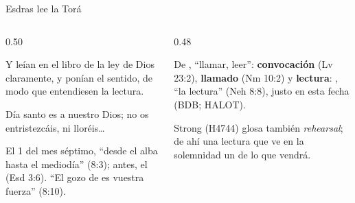 \begin{frame}{Esdras lee la Torá}
\begin{columns}[t,onlytextwidth]
\begin{column}{0.50\textwidth}
\begin{cita}Y leían en el libro de la ley de Dios claramente, y ponían el sentido, de modo que entendiesen la lectura.\end{cita}
\begin{cita}Día santo es a \SENOR{} nuestro Dios; no os entristezcáis, ni lloréis\ldots{}\end{cita}
\scriptsize\RaggedRight El 1 del mes séptimo, ``desde el alba hasta el mediodía'' (8:3); antes, el  (Esd 3:6). ``El gozo de \SENOR{} es vuestra fuerza'' (8:10).
\end{column}
\begin{column}{0.48\textwidth}
\begin{tcolorbox}[colback=papiro,colframe=tierraroja,boxrule=0.8pt,arc=3pt,fontupper=\scriptsize,title={\heb{מִקְרָא} \emph{mikrá}},fonttitle=\bfseries\scriptsize,colbacktitle=tierraroja,coltitle=papiro]
\RaggedRight De , ``llamar, leer'': \textbf{convocación} (Lv 23:2), \textbf{llamado} (Nm 10:2) y \textbf{lectura}: , ``la lectura'' (Neh 8:8), justo en esta fecha (BDB; HALOT).\par\smallskip
Strong (H4744) glosa también \emph{rehearsal}; de ahí una lectura que ve en la solemnidad un  de lo que vendrá.
\end{tcolorbox}
\end{column}
\end{columns}
\end{frame}


